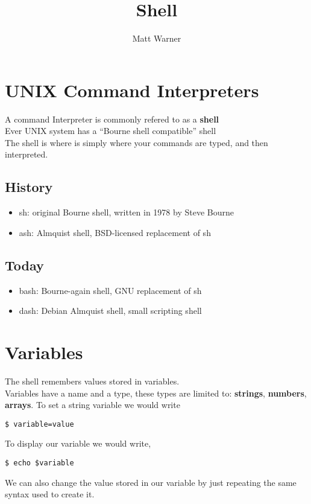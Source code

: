 \documentclass{report}
\title{\Huge{Shell}}
\author{\huge{Matt Warner}}
\date{\huge{}}
\begin{document}
  \maketitle
  \section{UNIX Command Interpreters}
 A command Interpreter is commonly refered to as a \textbf{shell} \\
 Ever UNIX system has a ``Bourne shell compatible'' shell  \\
 The shell is where is simply where your commands are typed, and then interpreted.
 \subsection{History}
 \begin{itemize}
   \item sh: original Bourne shell, written in 1978 by Steve Bourne 
   \item ash: Almquist shell, BSD-licensed replacement of sh
 \end{itemize}
 \subsection{Today}
 \begin{itemize}
   \item bash: Bourne-again shell, GNU replacement of sh 
   \item dash: Debian Almquist shell, small scripting shell
 \end{itemize}
\section{Variables}
The shell remembers values stored in variables. \\ Variables have a name and a type, these types are limited to: \textbf{strings}, \textbf{numbers}, \textbf{arrays}.
\bigbreak \noindent
To set a string variable we would write
\begin{verbatim}
$ variable=value
\end{verbatim}
To display our variable we would write,
\begin{verbatim}
$ echo $variable
\end{verbatim}
We can also change the value stored in our variable by just repeating the same syntax used to create it.
\end{document}
